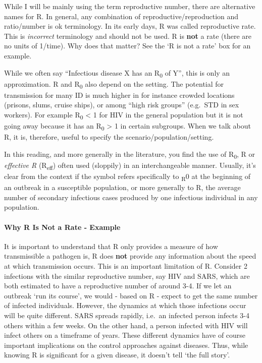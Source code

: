 \documentclass[]{article}
\let\oldparagraph\paragraph
\renewcommand{\paragraph}[1]{\oldparagraph{#1}\mbox{}}
\theoremstyle{definition}
\theoremstyle{definition}
\theoremstyle{definition}
\theoremstyle{remark}
\begin{document}
While I will be mainly using the term reproductive number, there are
alternative names for R. In general, any combination of
reproductive/reproduction and ratio/number is ok terminology. In its
early days, R was called reproductive rate. This is \emph{incorrect}
terminology and should not be used. R is \textbf{not} a rate (there are
no units of 1/time). Why does that matter? See the `R is not a rate' box
for an example.

While we often say ``Infectious disease X has an R\textsubscript{0} of
Y'', this is only an approximation. R and R\textsubscript{0} also depend
on the setting. The potential for transmission for many ID is much
higher in for instance crowded locations (prisons, slums, cruise ships),
or among ``high risk groups'' (e.g.~STD in sex workers). For example
R\textsubscript{0} \textless{} 1 for HIV in the general population but
it is not going away because it has an R\textsubscript{0} \textgreater{}
1 in certain subgroups. When we talk about R, it is, therefore, useful
to specify the scenario/population/setting.

In this reading, and more generally in the literature, you find the use
of R\textsubscript{0}, R or \emph{effective R} (R\textsubscript{eff})
often used (sloppily) in an interchangeable manner. Usually, it's clear
from the context if the symbol refers specifically to \textsubscript{R}0
at the beginning of an outbreak in a susceptible population, or more
generally to R, the average number of secondary infectious cases
produced by one infectious individual in any population.

\paragraph{Why R Is Not a Rate - Example}\label{myexamplebox}

It is important to understand that R only provides a measure of how
transmissible a pathogen is, R does \textbf{not} provide any information
about the speed at which transmission occurs. This is an important
limitation of R. Consider 2 infections with the similar reproductive
number, say HIV and SARS, which are both estimated to have a
reproductive number of around 3-4. If we let an outbreak `run its
course', we would - based on R - expect to get the same number of
infected individuals. However, the dynamics at which those infections
occur will be quite different. SARS spreads rapidly, i.e.~an infected
person infects 3-4 others within a few weeks. On the other hand, a
person infected with HIV will infect others on a timeframe of years.
These different dynamics have of course important implications on the
control approaches against diseases. Thus, while knowing R is
significant for a given disease, it doesn't tell `the full story'.
\end{document}
